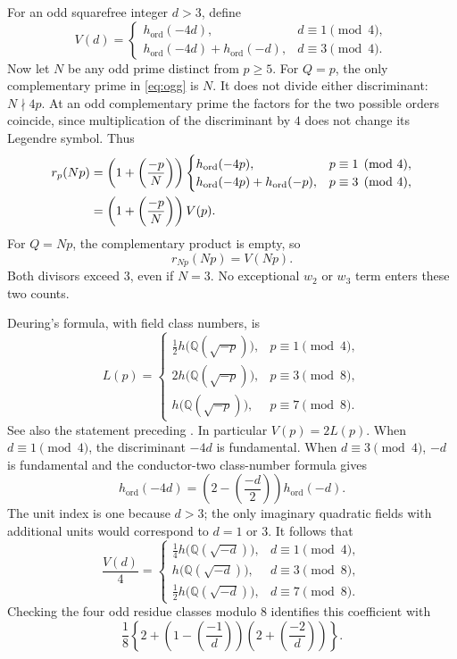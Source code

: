 \documentclass[11pt,a4paper]{article}
\theoremstyle{remark}\newtheorem{remark}[theorem]{Remark}
\numberwithin{equation}{section}
\newcommand{\Q}{\mathbb Q}\newcommand{\Z}{\mathbb Z}
\newcommand{\leg}[2]{\left(\frac{#1}{#2}\right)}
\newcommand{\ho}{h_{\mathrm{ord}}}
\newcommand{\hK}[1]{h\bigl(\Q(\sqrt{-#1})\bigr)}
\begin{document}
	For an odd squarefree integer $d>3$, define
	\[
	V(d)=\begin{cases}
		\ho(-4d),&d\equiv1\pmod4,\\
		\ho(-4d)+\ho(-d),&d\equiv3\pmod4.
	\end{cases}
	\]
	Now let $N$ be any odd prime distinct from $p\geq5$. For $Q=p$, the only complementary prime in \eqref{eq:ogg} is $N$. It does not divide either discriminant: $N\nmid4p$. At an odd complementary prime the factors for the two possible orders coincide, since multiplication of the discriminant by $4$ does not change its Legendre symbol. Thus
	\begin{align}
		r_p(Np)
		&=\left(1+\leg{-p}{N}\right)
		\begin{cases}\ho(-4p),&p\equiv1\pmod4,\\
			\ho(-4p)+\ho(-p),&p\equiv3\pmod4,\end{cases}\notag\\
		&=\left(1+\leg{-p}{N}\right)V(p).\label{eq:rp}
	\end{align}
	For $Q=Np$, the complementary product is empty, so
	\begin{equation}\label{eq:rnp}
		r_{Np}(Np)=V(Np).
	\end{equation}
	Both divisors exceed $3$, even if $N=3$. No exceptional $w_2$ or $w_3$ term enters these two counts.
	
	Deuring's formula, with field class numbers, is
	\begin{equation}\label{eq:deuring}
		L(p)=\begin{cases}
			\tfrac12\hK{p},&p\equiv1\pmod4,\\
			2\hK{p},&p\equiv3\pmod8,\\
			\hK{p},&p\equiv7\pmod8.
		\end{cases}
	\end{equation}
	See also the statement preceding \cite[Theorem 1.2]{Morton5b}. In particular $V(p)=2L(p)$. When $d\equiv1\pmod4$, the discriminant $-4d$ is fundamental. When $d\equiv3\pmod4$, $-d$ is fundamental and the conductor-two class-number formula gives
	\[
	\ho(-4d)=\left(2-\leg{-d}{2}\right)\ho(-d).
	\]
	The unit index is one because $d>3$; the only imaginary quadratic fields with additional units would correspond to $d=1$ or $3$. It follows that
	\begin{equation}\label{eq:Vfield}
		\frac{V(d)}4=\begin{cases}
			\tfrac14\hK{d},&d\equiv1\pmod4,\\
			\hK{d},&d\equiv3\pmod8,\\
			\tfrac12\hK{d},&d\equiv7\pmod8.
		\end{cases}
	\end{equation}
	Checking the four odd residue classes modulo $8$ identifies this coefficient with
	\begin{equation}\label{eq:coefficient}
		\frac18\left\{2+\left(1-\leg{-1}{d}\right)
		\left(2+\leg{-2}{d}\right)\right\}.
	\end{equation}
	
\end{document}
